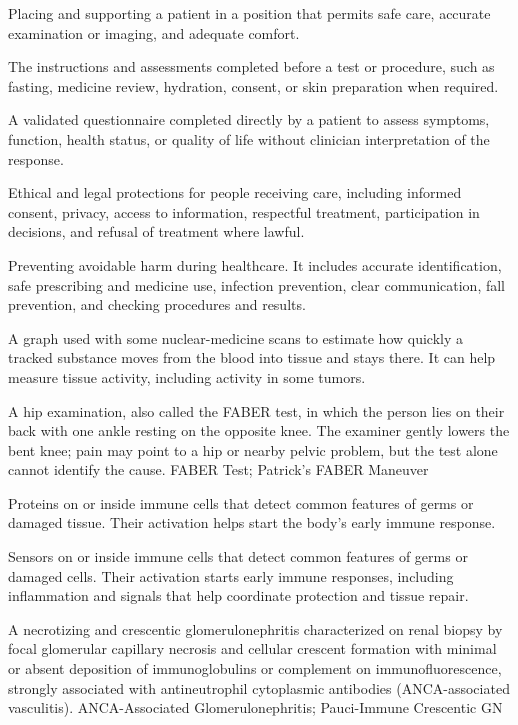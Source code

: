  Placing and supporting a patient in a position that permits safe care, accurate examination or imaging, and adequate comfort.

 The instructions and assessments completed before a test or procedure, such as fasting, medicine review, hydration, consent, or skin preparation when required.

 A validated questionnaire completed directly by a patient to assess symptoms, function,
health status, or quality of life without clinician interpretation of the response.

 Ethical and legal protections for people receiving care, including informed consent, privacy, access to information, respectful treatment, participation in decisions, and refusal of treatment where lawful.

 Preventing avoidable harm during healthcare. It includes accurate identification, safe prescribing and medicine use, infection prevention, clear communication, fall prevention, and checking procedures and results.

 A graph used with some nuclear-medicine scans to estimate how quickly a tracked substance moves from the blood into tissue and stays there. It can help measure tissue activity, including activity in some tumors.

 A hip examination, also called the FABER test, in which the person lies on their back with one ankle resting on the opposite knee. The examiner gently lowers the bent knee; pain may point to a hip or nearby pelvic problem, but the test alone cannot identify the cause.
\synonyms
FABER Test; Patrick's FABER Maneuver

 Proteins on or inside immune cells that detect common features of germs or damaged tissue. Their activation helps start the body’s early immune response.

 Sensors on or inside immune cells that detect common features of germs or damaged cells. Their activation starts early immune responses, including inflammation and signals that help coordinate protection and tissue repair.

 A necrotizing and crescentic glomerulonephritis characterized on renal biopsy by focal glomerular capillary necrosis and cellular crescent formation with minimal or absent deposition of immunoglobulins or complement on immunofluorescence, strongly associated with antineutrophil cytoplasmic antibodies (ANCA-associated vasculitis).
\synonyms
ANCA-Associated Glomerulonephritis; Pauci-Immune Crescentic GN

